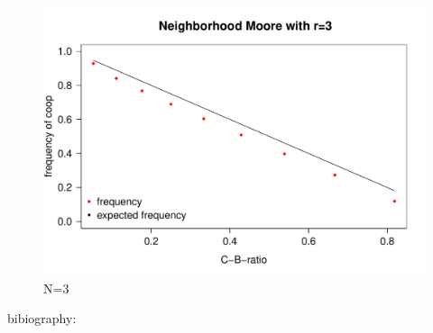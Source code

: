 \documentclass[DIV=calc, paper=a4, fontsize=11pt, twocolumn]{scrartcl}	 %
\begin{document}
\begin{figure}[here]
\begin{minipage}{.40\textwidth}
  \centering
  \includegraphics[width=1\linewidth]{HDm3}
 \caption{N=3}
\label{fig:HDm3}
\end{minipage}%
\end{figure}



bibiography: 

\nocite{Albizu2013}



\end{document}

